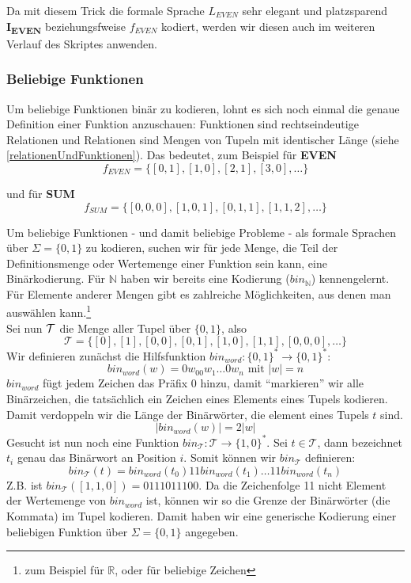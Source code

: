 Da mit diesem Trick die formale Sprache $L_{EVEN}$ sehr elegant und platzsparend
\textbf{I\textsubscript{EVEN}} beziehungsfweise $f_{EVEN}$ kodiert,
werden wir diesen auch im weiteren Verlauf des Skriptes anwenden.

\subsubsection{Beliebige Funktionen}
Um beliebige Funktionen binär zu kodieren,
lohnt es sich noch einmal die genaue Definition einer Funktion anzuschauen:
Funktionen sind rechtseindeutige Relationen und Relationen sind Mengen von Tupeln mit identischer Länge (siehe \autoref{relationenUndFunktionen}).
Das bedeutet, zum Beispiel für \textbf{EVEN}
\[
    f_{EVEN} = \{ [0,1], [1,0], [2,1], [3,0], \ldots \}
\]

und für \textbf{SUM}
\[
    f_{SUM} = \{ [0,0,0], [1,0,1], [0,1,1], [1,1,2], \ldots \}
\]

Um beliebige Funktionen - und damit beliebige Probleme -
als formale Sprachen über $\Sigma = \{0,1\}$ zu kodieren,
suchen wir für jede Menge,
die Teil der Definitionsmenge oder Wertemenge einer Funktion sein kann,
eine Binärkodierung.
Für $\mathbb{N}$
haben wir bereits eine Kodierung ($bin_{\mathbb{N}}$) kennengelernt.
Für Elemente anderer Mengen gibt es zahlreiche Möglichkeiten,
aus denen man auswählen kann.\footnote{
    zum Beispiel \cite{ieee754} für $\mathbb{R}$,
    oder \cite{RFC3629} für beliebige Zeichen
}\\

\noindent
Sei nun $\cal{T}$ die Menge aller Tupel über $\{0,1\}$, also
\[
    \mathcal{T} = \{[0], [1], [0,0], [0,1], [1,0], [1,1], [0,0,0], \ldots \}
\]
Wir definieren zunächst die Hilfsfunktion $bin_{word}: \{0,1\}^* \rightarrow \{0,1\}^*$:
\[
    bin_{word}(w) = 0w_00w_1\ldots0w_n \text{ mit } |w| = n
\]
$bin_{word}$ fügt jedem Zeichen das Präfix 0 hinzu,
damit ``markieren'' wir alle Binärzeichen,
die tatsächlich ein Zeichen eines Elements eines Tupels kodieren.
Damit verdoppeln wir die Länge der Binärwörter, die element eines Tupels $t$ sind.
\[
    |bin_{word}(w)| = 2|w|
\]
Gesucht ist nun noch eine Funktion $bin_{\mathcal{T}}: \mathcal{T} \rightarrow \{1,0\}^*$.
Sei $t \in \mathcal{T}$, dann bezeichnet $t_i$ genau das Binärwort an Position $i$.
Somit können wir $bin_{\mathcal{T}}$ definieren:
\[
    bin_{\mathcal{T}}(t) = bin_{word}(t_0)11bin_{word}(t_1)\ldots 11bin_{word}(t_{n})
\]
Z.B. ist $bin_{\mathcal{T}}([1,1,0]) = 0111011100$.
Da die Zeichenfolge 11 nicht Element der Wertemenge von $bin_{word}$ ist,
können wir so die Grenze der Binärwörter (die Kommata) im Tupel kodieren.
Damit haben wir eine generische Kodierung einer beliebigen Funktion
über $\Sigma = \{0,1\}$ angegeben.

